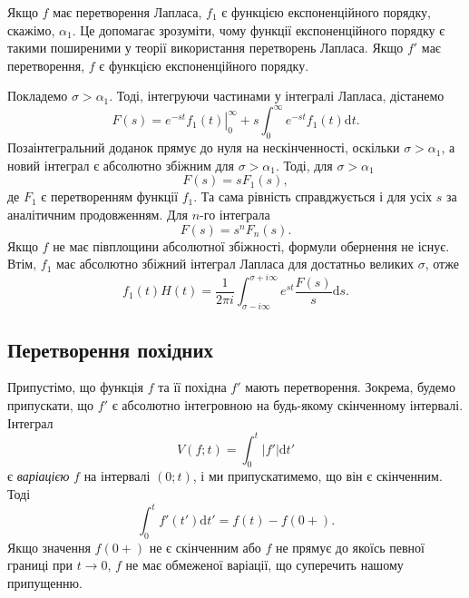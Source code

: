 \documentclass[14pt,twoside]{extreport}
\theoremstyle{mystyle}
\numberwithin{equation}{chapter}
\begin{document}
Якщо $f$ має перетворення Лапласа, $f_{1}$ є функцією експоненційного порядку, скажімо, $\alpha_{1}$. Це допомагає зрозуміти, чому функції експоненційного порядку є такими поширеними у теорії використання перетворень Лапласа. Якщо $f'$ має перетворення, $f$ є функцією експоненційного порядку.

Покладемо $\sigma>\alpha_{1}$. Тоді, інтегруючи частинами у інтегралі Лапласа, дістанемо
\begin{equation*}
	\displaystyle F(s)=\left.e^{-st}f_{1}(t)\right|_{0}^{\infty} + s\int_{0}^{\infty}e^{-st}f_{1}(t)\mathrm{d}t.
\end{equation*}
Позаінтегральний доданок прямує до нуля на нескінченності, оскільки $\sigma>\alpha_{1}$, а новий інтеграл є абсолютно збіжним для $\sigma>\alpha_{1}$. Тоді, для $\sigma>\alpha_{1}$
\begin{equation*}
	F(s)=sF_{1}(s),
\end{equation*}
де $F_{1}$ є перетворенням функції $f_{1}$. Та сама рівність справджується і для усіх $s$ за аналітичним продовженням. Для $n$-го інтеграла
\begin{equation*}
	F(s)=s^{n}F_{n}(s).
\end{equation*}
Якщо $f$ не має півплощини абсолютної збіжності, формули обернення не існує. Втім, $f_{1}$ має абсолютно збіжний інтеграл Лапласа для достатньо великих $\sigma$, отже
\begin{equation*}
	f_{1}(t)H(t)=\dfrac{1}{2 \pi i}\int_{\sigma-i\infty}^{\sigma+i\infty}e^{st}\dfrac{F(s)}{s}\mathrm{d}s.
\end{equation*}

\subsection{Перетворення похідних}

Припустімо, що функція $f$ та її похідна $f'$ мають перетворення. Зокрема, будемо припускати, що $f'$ є абсолютно інтегровною на будь-якому скінченному інтервалі. Інтеграл
\begin{equation*}
	V(f;t)=\displaystyle \int_{0}^{t}|f'|\mathrm{d}t'
\end{equation*}
є \emph{варіацією} $f$ на інтервалі $(0; t)$, і ми припускатимемо, що він є скінченним. Тоді
\begin{equation*}
	\displaystyle \int_{0}^{t}f'(t')\mathrm{d}t'=f(t)-f(0+).
\end{equation*}
Якщо значення $f(0+)$ не є скінченним або $f$ не прямує до якоїсь певної границі при $t\to  0$, $f$ не має обмеженої варіації, що суперечить нашому припущенню.
\end{document}
